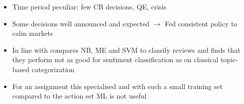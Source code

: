 
\begin{itemize}
	\item Time period peculiar: few CB decisions, QE, crisis
	\item Some decisions well announced and expected $\rightarrow$ Fed consistent policy to calm markets
	\item In line with \textcite{Pang.2002} compares NB, ME and SVM to classify reviews and finds that they perform not as good for sentiment classification as on classical topic-based categorization
	\item For an assignment this specialised and with such a small training set compared to the action set ML is not useful
\end{itemize}